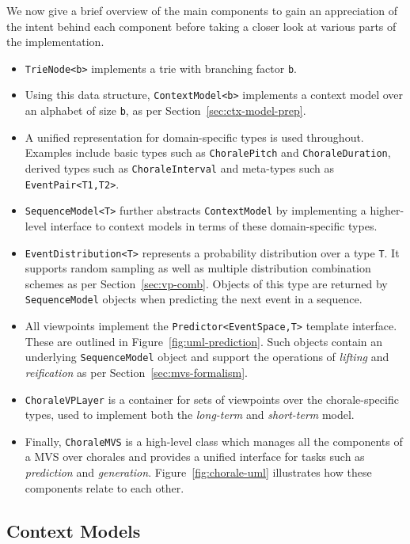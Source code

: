 \documentclass[12pt,a4paper,twoside,openright]{report}
\newcommand{\sref}[1]{Section~\ref{#1}}
\begin{document}
We now give a brief overview of the main components to gain an appreciation of
the intent behind each component before taking a closer look at various parts of
the implementation.

\begin{itemize}
  \item \texttt{TrieNode<b>} implements a trie with branching factor \texttt{b}.
  \item Using this data structure, \texttt{ContextModel<b>} implements a context
    model over an alphabet of size \texttt{b}, as per
    \sref{sec:ctx-model-prep}.   
  \item A unified representation for domain-specific types is used throughout.
    Examples include basic types such as \texttt{ChoralePitch} and
    \texttt{ChoraleDuration}, derived types such as \texttt{ChoraleInterval} and
    meta-types such as \texttt{EventPair<T1,T2>}.
  \item \texttt{SequenceModel<T>} further abstracts \texttt{ContextModel} by
    implementing a higher-level interface to context models in terms of these
    domain-specific types.
  \item \texttt{EventDistribution<T>} represents a probability distribution over
    a type \texttt{T}. It supports random sampling as well as multiple
    distribution combination schemes as per \sref{sec:vp-comb}. Objects
    of this type are returned by \texttt{SequenceModel} objects when predicting
    the next event in a sequence.
  \item All viewpoints implement the \texttt{Predictor<EventSpace,T>} template
    interface. These are outlined in Figure~\ref{fig:uml-prediction}. Such
    objects contain an underlying \texttt{SequenceModel} object and support the
    operations of \emph{lifting} and \emph{reification} as per
    \sref{sec:mvs-formalism}.
  \item \texttt{ChoraleVPLayer} is a container for sets of viewpoints over the
    chorale-specific types, used to implement both the \emph{long-term} and
    \emph{short-term} model.
  \item Finally, \texttt{ChoraleMVS} is a high-level class which manages all the
    components of a MVS over chorales and provides a unified interface for tasks
    such as \emph{prediction} and \emph{generation}.
    Figure~\ref{fig:chorale-uml} illustrates how these components relate to each
    other.
\end{itemize}

\subsection{Context Models}
\end{document}
